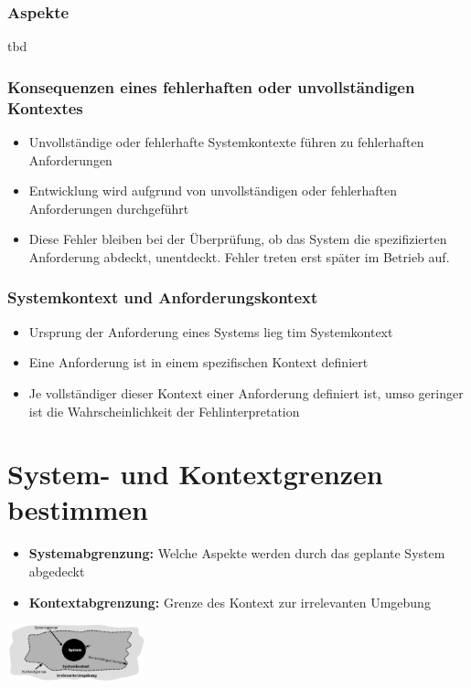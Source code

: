 \documentclass{report}
\newenvironment{Figure}
	{\par\medskip\noindent\minipage{\linewidth}}
	{\endminipage\par\medskip}
\theoremstyle{definition}
\theoremstyle{example}
\begin{document}
\subsubsection{Aspekte}
tbd

\subsubsection{Konsequenzen eines fehlerhaften oder unvollständigen Kontextes}
\begin{itemize}
   \item Unvollständige oder fehlerhafte Systemkontexte führen zu fehlerhaften Anforderungen
   \item Entwicklung wird aufgrund von unvollständigen oder fehlerhaften Anforderungen durchgeführt
   \item Diese Fehler bleiben bei der Überprüfung, ob das System die spezifizierten Anforderung abdeckt, unentdeckt. Fehler treten erst später im Betrieb auf.
\end{itemize}

\subsubsection{Systemkontext und Anforderungskontext}
\begin{itemize}
   \item Ursprung der Anforderung eines Systems lieg tim Systemkontext
   \item Eine Anforderung ist in einem spezifischen Kontext definiert
   \item Je vollständiger dieser Kontext einer Anforderung definiert ist, umso geringer ist die Wahrscheinlichkeit der Fehlinterpretation
\end{itemize}

\section{System- und Kontextgrenzen bestimmen}
\begin{itemize}
   \item \textbf{Systemabgrenzung:} Welche Aspekte werden durch das geplante System abgedeckt
   \item \textbf{Kontextabgrenzung:} Grenze des Kontext zur irrelevanten Umgebung
\end{itemize}

\begin{Figure}
   \centering
    \includegraphics[width=150px]{img/Abgrenzung.png}
        \label{fig:System- und Kontextabgrenzung}
\end{Figure}
\end{document}
